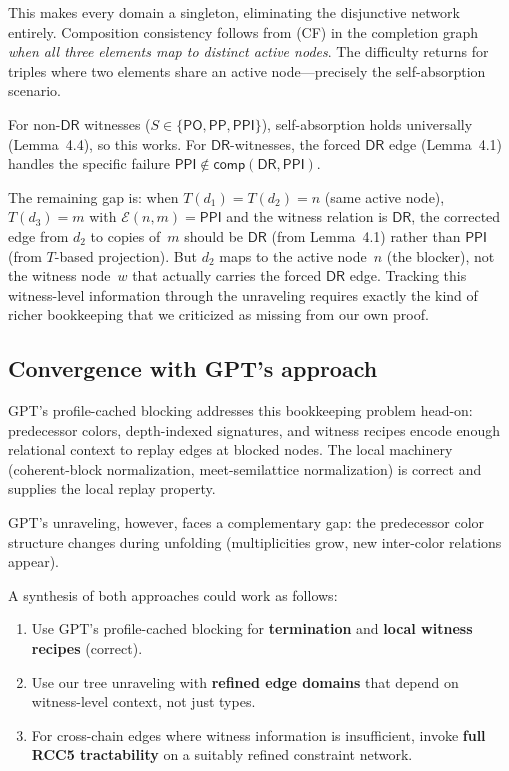 \documentclass[a4paper,11pt]{article}
\theoremstyle{definition}
\newcommand{\DR}{\ensuremath{\mathsf{DR}}}
\newcommand{\PO}{\ensuremath{\mathsf{PO}}}
\newcommand{\PP}{\ensuremath{\mathsf{PP}}}
\newcommand{\PPI}{\ensuremath{\mathsf{PPI}}}
\newcommand{\comp}{\ensuremath{\mathsf{comp}}}
\begin{document}
This makes every domain a singleton, eliminating the disjunctive
network entirely.  Composition consistency follows from (CF) in the
completion graph \emph{when all three elements map to distinct active
nodes}.  The difficulty returns for triples where two elements share
an active node---precisely the self-absorption scenario.

For non-$\DR$ witnesses ($S \in \{\PO, \PP, \PPI\}$), self-absorption
holds universally (Lemma~4.4), so this works.  For $\DR$-witnesses,
the forced $\DR$ edge (Lemma~4.1) handles the specific failure
$\PPI \notin \comp(\DR, \PPI)$.

The remaining gap is: when $T(d_1) = T(d_2) = n$ (same active node),
$T(d_3) = m$ with $\mathcal{E}(n, m) = \PPI$ and the witness
relation is $\DR$, the corrected edge from $d_2$ to copies of~$m$
should be $\DR$ (from Lemma~4.1) rather than $\PPI$ (from $T$-based
projection).  But $d_2$ maps to the active node~$n$ (the blocker),
not the witness node~$w$ that actually carries the forced $\DR$ edge.
Tracking this witness-level information through the unraveling
requires exactly the kind of richer bookkeeping that we criticized
as missing from our own proof.

\subsection{Convergence with GPT's approach}

GPT's profile-cached blocking addresses this bookkeeping problem head-on:
predecessor colors, depth-indexed signatures, and witness recipes
encode enough relational context to replay edges at blocked nodes.
The local machinery (coherent-block normalization, meet-semilattice
normalization) is correct and supplies the local replay property.

GPT's unraveling, however, faces a complementary gap: the
predecessor color structure changes during unfolding (multiplicities
grow, new inter-color relations appear).

A synthesis of both approaches could work as follows:
\begin{enumerate}[nosep]
  \item Use GPT's profile-cached blocking for \textbf{termination} and
    \textbf{local witness recipes} (correct).
  \item Use our tree unraveling with \textbf{refined edge domains}
    that depend on witness-level context, not just types.
  \item For cross-chain edges where witness information is
    insufficient, invoke \textbf{full RCC5 tractability} on a
    suitably refined constraint network.
\end{enumerate}
\end{document}

